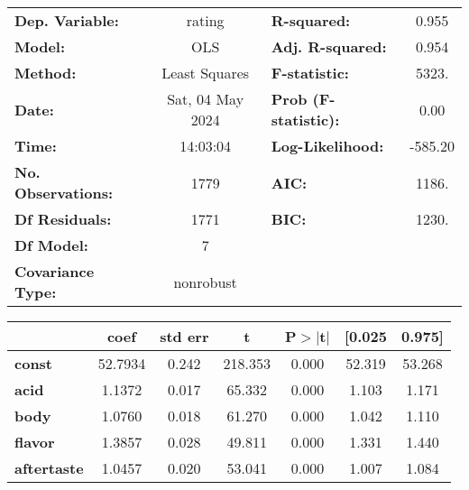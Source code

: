 \documentclass[11pt]{article}
\begin{document}
    \begin{center}
\begin{tabular}{lclc}
\toprule
\textbf{Dep. Variable:}       &      rating      & \textbf{  R-squared:         } &     0.955   \\
\textbf{Model:}               &       OLS        & \textbf{  Adj. R-squared:    } &     0.954   \\
\textbf{Method:}              &  Least Squares   & \textbf{  F-statistic:       } &     5323.   \\
\textbf{Date:}                & Sat, 04 May 2024 & \textbf{  Prob (F-statistic):} &     0.00    \\
\textbf{Time:}                &     14:03:04     & \textbf{  Log-Likelihood:    } &   -585.20   \\
\textbf{No. Observations:}    &        1779      & \textbf{  AIC:               } &     1186.   \\
\textbf{Df Residuals:}        &        1771      & \textbf{  BIC:               } &     1230.   \\
\textbf{Df Model:}            &           7      & \textbf{                     } &             \\
\textbf{Covariance Type:}     &    nonrobust     & \textbf{                     } &             \\
\bottomrule
\end{tabular}
\begin{tabular}{lcccccc}
                              & \textbf{coef} & \textbf{std err} & \textbf{t} & \textbf{P$> |$t$|$} & \textbf{[0.025} & \textbf{0.975]}  \\
\midrule
\textbf{const}                &      52.7934  &        0.242     &   218.353  &         0.000        &       52.319    &       53.268     \\
\textbf{acid}                 &       1.1372  &        0.017     &    65.332  &         0.000        &        1.103    &        1.171     \\
\textbf{body}                 &       1.0760  &        0.018     &    61.270  &         0.000        &        1.042    &        1.110     \\
\textbf{flavor}               &       1.3857  &        0.028     &    49.811  &         0.000        &        1.331    &        1.440     \\
\textbf{aftertaste}           &       1.0457  &        0.020     &    53.041  &         0.000        &        1.007    &        1.084     \\

\end{tabular}
\end{center}
\end{document}
